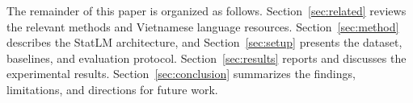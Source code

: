 The remainder of this paper is organized as follows. Section~\ref{sec:related}
reviews the relevant methods and Vietnamese language resources.
Section~\ref{sec:method} describes the StatLM architecture, and
Section~\ref{sec:setup} presents the dataset, baselines, and evaluation protocol.
Section~\ref{sec:results} reports and discusses the experimental results.
Section~\ref{sec:conclusion} summarizes the findings, limitations, and directions
for future work.
